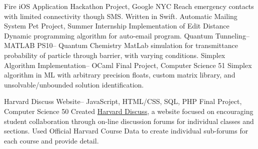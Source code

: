 \documentclass[]{friggeri-cv} %
\begin{document}
{Fire iOS Application}
{Hackathon Project, Google NYC}
{Reach emergency contacts with limited connectivity though SMS. Written in Swift.}
{Automatic Mailing System}
{Pet Project, Summer Internship}
{Implementation of Edit Distance Dynamic programming algorithm for auto-email program.}
{Quantum Tunneling-- MATLAB}
{PS10-- Quantum Chemistry}
{MatLab simulation for transmittance probability of particle through barrier, with varying conditions.}
{Simplex Algorithm Implementation-- OCaml}
{Final Project, Computer Science 51}
{Simplex algorithm in ML with arbitrary precision floats, custom matrix library, and unsolvable/unbounded solution identification.}
\begin{detailed}
{Harvard Discuss Website-- JavaScript, HTML/CSS, SQL, PHP}
{Final Project, Computer Science 50}
{Created \href{https://www.hcs.harvard.edu/~harvarddiscuss/index.php/en/}{Harvard Discuss}, a website focused on encouraging student collaboration through on-line discussion forums for individual classes and sections. Used Official Harvard Course Data to create individual sub-forums for each course and provide detail.}
\end{detailed}

\end{document}
